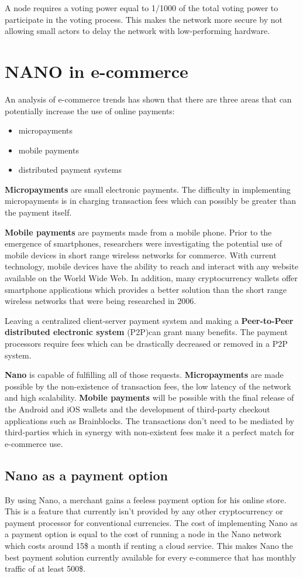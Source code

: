 \documentclass{ferseminar}
\begin{document}
A node requires a voting power equal to 1/1000 of the total voting power to participate in the voting process. This makes the network more secure by not allowing small actors to delay the network with low-performing hardware.

\section{NANO in e-commerce}
An analysis of e-commerce trends \cite{Lowry} has shown that there are three areas that can potentially increase the use of online payments:
\begin{itemize}
	\item micropayments
	\item mobile payments
	\item distributed payment systems
\end{itemize}

\textbf{Micropayments} are small electronic payments. The difficulty in implementing micropayments is in charging transaction fees which can possibly be greater than the payment itself.

\textbf{Mobile payments} are payments made from a mobile phone. Prior to the emergence of smartphones, researchers were investigating the potential use of mobile devices in short range wireless networks for commerce. With current technology, mobile devices have the ability to reach and interact with any website available on the World Wide Web. In addition, many cryptocurrency wallets offer smartphone applications which provides a better solution than the short range wireless networks that were being researched in 2006.  

Leaving a centralized client-server payment system and making a \textbf{Peer-to-Peer distributed electronic system} (P2P)can grant many benefits. The payment processors require fees which can be drastically decreased or removed in a P2P system.

\textbf{Nano} is capable of fulfilling all of those requests. \textbf{Micropayments} are made possible by the non-existence of transaction fees, the low latency of the network and high scalability. \textbf{Mobile payments} will be possible with the final release of the Android and iOS wallets and the development of third-party checkout applications such as Brainblocks. The transactions don't need to be mediated by third-parties which in synergy with non-existent fees make it a perfect match for e-commerce use.

\subsection{Nano as a payment option}
By using Nano, a merchant gains a feeless payment option for his online store. This is a feature that currently isn't provided by any other cryptocurrency or payment processor for conventional currencies. The cost of implementing Nano as a payment option is equal to the cost of running a node in the Nano network which costs around 15\$ a month if renting a cloud service. This makes Nano the best payment solution currently available for every e-commerce that has monthly traffic of at least 500\$.
\end{document}
